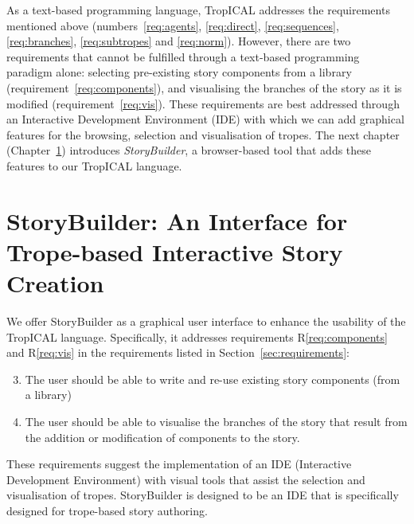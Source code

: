 \documentclass[11pt]{report}
\begin{document}
As a text-based programming language, TropICAL addresses the requirements
mentioned above (numbers~\ref{req:agents}, \ref{req:direct},
\ref{req:sequences}, \ref{req:branches}, \ref{req:subtropes} and
\ref{req:norm}). However, there are two requirements that cannot be fulfilled
through a text-based programming paradigm alone: selecting pre-existing story
components from a library (requirement~\ref{req:components}), and visualising
the branches of the story as it is modified (requirement~\ref{req:vis}). These
requirements are best addressed through an Interactive Development Environment
(IDE) with which we can add graphical features for the browsing, selection and
visualisation of tropes. The next chapter (Chapter~\ref{cha:storybuilder})
introduces \emph{StoryBuilder}, a browser-based tool that adds these features to
our TropICAL language.




\chapter{StoryBuilder: An Interface for Trope-based Interactive Story Creation}
\label{cha:storybuilder}
We offer StoryBuilder as a graphical user interface to enhance the usability of
the TropICAL language. Specifically, it addresses requirements
R\ref{req:components} and R\ref{req:vis} in the requirements listed in Section~\ref{sec:requirements}:

\begin{enumerate}[R1.]
  \setcounter{enumi}{2}
  \item The user should be able to write and re-use
    existing story components (from a library)
  \setcounter{enumi}{6}
  \item The user should be able to visualise the branches of the
    story that result from the addition or modification of components to the story.
\end{enumerate}

These requirements suggest the implementation of an IDE (Interactive Development
Environment) with visual tools that assist the selection and visualisation of
tropes. StoryBuilder is designed to be an IDE that is specifically designed for
trope-based story authoring.
\end{document}
